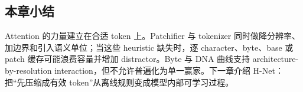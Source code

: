 

\subsection{本章小结}

Attention 的力量建立在合适 token 上。Patchifier 与 tokenizer 同时做降分辨率、加边界和引入语义单位；当这些 heuristic 缺失时，逐 character、byte、base 或 patch 缓存可能浪费容量并增加 distractor。Byte 与 DNA 曲线支持 architecture-by-resolution interaction，但不允许普遍化为单一赢家。下一章介绍 H-Net：把“先压缩成有效 token”从离线规则变成模型内部可学习过程。

